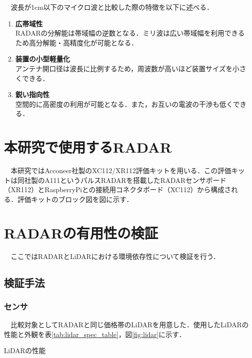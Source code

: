 　波長が1cm以下のマイクロ波と比較した際の特徴を以下に述べる\cite{feature_RadioWaves}．
\begin{enumerate}
    \item \textbf{広帯域性}\\
        RADARの分解能は帯域幅の逆数となる．ミリ波は広い帯域幅を利用できるため高分解能・高精度化が可能となる．
    \item \textbf{装置の小型軽量化}\\
        アンテナ開口径は波長に比例するため，周波数が高いほど装置サイズを小さくできる．
    \item \textbf{鋭い指向性}\\
        空間的に高密度の利用が可能となる．また，お互いの電波の干渉も低くできる．
\end{enumerate}


\section{本研究で使用するRADAR}
　本研究ではAcconeer社製のXC112/XR112評価キットを用いる．この評価キットは同社製のA111というパルスRADARを搭載したRADARセンサボード（XR112）とRaspberryPiとの接続用コネクタボード（XC112）から構成される．評価キットのブロック図を図に示す．







\section{RADARの有用性の検証}
　ここではRADARとLiDARにおける環境依存性について検証を行う．

\subsection{検証手法}
\subsubsection{センサ}
　比較対象としてRADARと同じ価格帯のLiDARを用意した．使用したLiDARの性能と外観を表\ref{tab:lidar_spec_table}，図\ref{fig:lidar}に示す．\cite{lidar_datasheet}

\begin{table}[htbp]
    \centering
    \caption{LiDARの性能}
    
    \label{tab:lidar_spec_table}
\end{table}

